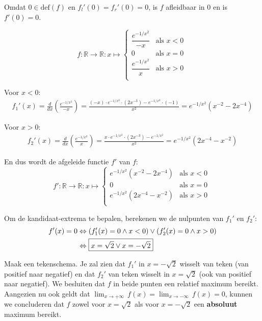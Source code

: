 \documentclass[kulak]{kulakarticle} %
\newcommand{\R}{\mathbb{R}}
\renewcommand{\boxed}[1]{\text{\fboxsep=.3em\fbox{#1}}}
\begin{document}
	Omdat \(0\in \text{def}(f)\) en \(f_l'(0) = f_r'(0) = 0\), is \(f\) afleidbaar in 0 en is \(f'(0)=0\).\newpage

	\[ f :\R \to \R : x \mapsto \left\{
	\begin{array}{ll}
		\dfrac{  e^{-1/x^2}  }{ -x } 	& \text{als } x<0 \\
		0 												& \text{als } x=0 \\
		\dfrac{  e^{-1/x^2}  }{ x } 	& \text{als } x>0 \\
	\end{array} \right. \ \]

	Voor \(x<0\):
	\begin{align*}
		f_{1}'(x) = \frac{d}{dx} \left( \frac{e^{-1/x^2}  }{ -x }  \right) = \frac{ (-x) \cdot e^{-1/x^2} \cdot (2x^{-3}) - e^{-1/x^2} \cdot (-1) }{x^2} = e^{-1/x^2}(x^{-2}-2x^{-4})
	\end{align*}

	Voor \(x>0\):
	\begin{align*}
		f_{2}'(x) = \frac{d}{dx} \left( \frac{e^{-1/x^2}  }{ x }  \right) = \frac{ x \cdot e^{-1/x^2} \cdot (2x^{-3}) - e^{-1/x^2} }{x^2} = e^{-1/x^2}(2x^{-4}-x^{-2})
	\end{align*}

	En dus wordt de afgeleide functie \(f'\) van \(f\): \[
	f' :\R \to \R : x \mapsto \left\{
	\begin{array}{ll}
		e^{-1/x^2}(x^{-2}-2x^{-4})	& \text{als } x<0 \\
		0 												& \text{als } x=0 \\
		e^{-1/x^2}(2x^{-4}-x^{-2})	& \text{als } x>0 \\
	\end{array} \right. \ \]

	Om de kandidaat-extrema te bepalen, berekenen we de nulpunten van \(f_1'\) en \(f_2'\):
	\begin{align*}
		f'(x)=0 & \Leftrightarrow (f_{1}'(x)=0  \land x<0) \lor (f_{2}'(x)=0 \land x>0) \\
					& \Leftrightarrow \boxed{\(x=\sqrt{2} \lor x=-\sqrt{2}\)}
	\end{align*}

	Maak een tekenschema. Je zal zien dat \(f_1'\) in \(x=-\sqrt{2}\) wisselt van teken (van positief naar negatief) en dat \(f_2'\) van teken wisselt in \(x=\sqrt{2}\) (ook van positief naar negatief). We besluiten dat \(f\) in beide punten een relatief maximum bereikt.\\

	Aangezien nu ook geldt dat \(\lim_{x\to +\infty} \, f(x) = \lim_{x\to -\infty} \, f(x) =0\), kunnen we concluderen dat \(f\) zowel voor \(x=\sqrt{2}\) als voor \(x=-\sqrt{2}\) een \textbf{absoluut} maximum bereikt.
\end{document}
